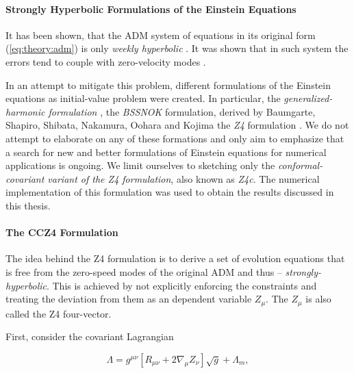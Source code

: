 

\paragraph{Strongly Hyperbolic Formulations of the Einstein Equations}


It has been shown, that the ADM system of equations in its original form (\ref{eq:theory:adm}) is only \textit{weekly hyperbolic} \cite{Baumgarte:2002jm}. 
It was shown that in such system the errors tend to couple with zero-velocity modes \cite{Alcubierre:1999rt}. 

In an attempt to mitigate this problem, different formulations of the Einstein equations as initial-value problem were created. 
In particular, the \textit{generalized-harmonic formulation} \cite{Friedrich:1985,Lindblom:2005qh,Lindblom:2009}, 
the \textit{BSSNOK} formulation, derived by Baumgarte, Shapiro, Shibata, Nakamura, Oohara and Kojima \cite{Nakamura1987,Shibata:1995we,Baumgarte:1998te} 
the \textit{Z4} formulation \cite{Bona:2003fj,Bernuzzi:2009ex,Ruiz:2010qj,Weyhausen:2011cg,Alic:2011gg}. 
We do not attempt to elaborate on any of these formations and only aim to emphasize that a search for new and better formulations of Einstein equations for numerical applications is ongoing. 
We limit ourselves to sketching only the \textit{conformal-covariant variant of the Z4 formulation}, also known as \textit{Z4c}. 
The numerical implementation of this formulation was used to obtain the results discussed in this thesis. 


\paragraph{The CCZ4 Formulation}


The idea behind the Z4 formulation is to derive a set of evolution equations that is free from the zero-speed modes of the original ADM and thus -- \textit{strongly-hyperbolic}. 
This is achieved by not explicitly enforcing the constraints and treating the deviation from them as an dependent variable $Z_{\mu}$. The $Z_{\mu}$ is also called the Z4 four-vector.

First, consider the covariant Lagrangian

\begin{equation}
\Lambda = g^{\mu\nu}[R_{\mu\nu} + 2\nabla_{\mu}Z_{\nu}]\sqrt{g} + \Lambda_m,
\end{equation}

